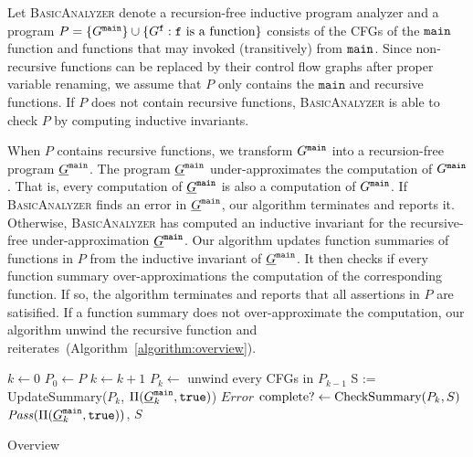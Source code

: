 
Let \textsc{BasicAnalyzer} denote a recursion-free inductive program
analyzer and a program $P=\{G^{\mathtt{{main}}}\}\cup\{G^{\mathtt{{f}}} : \mathtt{{f}}\mbox{ is a function}\}$ consists of the CFGs of the $\mathtt{{main}}$ function and functions that may invoked (transitively) from $\mathtt{{main}}$.
Since non-recursive functions can be replaced by their control flow graphs
after proper variable renaming, we assume that $P$ only contains the
$\mathtt{main}$ and recursive functions. If $P$ does not contain
recursive functions, \textsc{BasicAnalyzer} is able to check $P$ by
computing inductive invariants.

When $P$ contains recursive functions, we transform $G^{\mathtt{{main}}}$ into a
recursion-free program $\underline{G}^{\mathtt{{main}}}$. The program $\underline{G}^{\mathtt{{main}}}$
under-approximates the computation of $G^{\mathtt{{main}}}$. That is, every computation
of $\underline{G}^{\mathtt{{main}}}$ is also a computation of $G^{\mathtt{{main}}}$. If
\textsc{BasicAnalyzer} finds an error in $\underline{G}^{\mathtt{{main}}}$, our
algorithm terminates and reports it. Otherwise,
\textsc{BasicAnalyzer} has computed an inductive invariant for the
recursive-free under-approximation $\underline{G}^{\mathtt{{main}}}$. Our algorithm
updates function summaries of functions in $P$ from the inductive invariant of
$\underline{G}^{\mathtt{{main}}}$. It then checks if every function summary
over-approximations the computation of the corresponding function. If
so, the algorithm terminates and reports that all assertions in $P$
are satisified. If a function summary does not over-approximate the
computation, our algorithm unwind the recursive function and
reiterates~(Algorithm~\ref{algorithm:overview}).

\begin{algorithm}

  $k \leftarrow 0$\;
  $P_0 \leftarrow P$\;
  {
    $k \leftarrow k + 1$\;
    $P_{k} \leftarrow $ unwind every CFGs in $P_{k-1}$\;
    {
      {    
        S := UpdateSummary($P_k$, $\Pi (\underline{G}^{\mathtt{{main}}}_k, \mathtt{true})$)\;
      }
      {
        \Return $\mathit{Error}$\;
      }
    }
    $\textmd{complete?} \leftarrow \textmd{CheckSummary} (P_k, S)$\;
  }
  \Return $\mathit{Pass} (\Pi (\underline{G}^{\mathtt{{main}}}_k, \mathtt{true}))$, $S$\;
  \caption{Overview}
  \label{algorithm:overview}
\end{algorithm}

